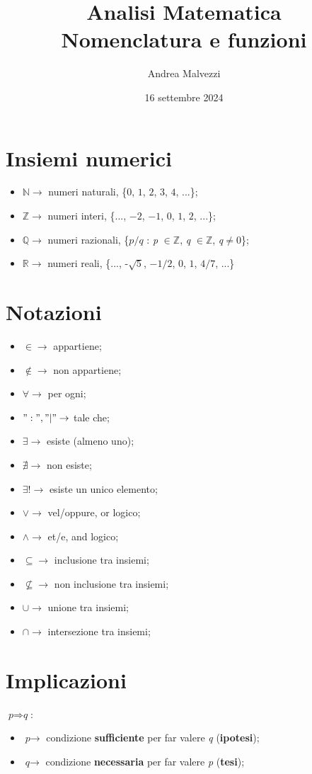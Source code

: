 \documentclass[12pt]{article}
\title{\textbf{Analisi Matematica\\Nomenclatura e funzioni}}
\date{16 settembre 2024}
\author{Andrea Malvezzi}
\begin{document}
\maketitle
\pagebreak
\tableofcontents
\pagebreak
\section{Insiemi numerici}
\begin{itemize}
    \item $\mathbb{N} \rightarrow$ numeri naturali, \{$0$, $1$, $2$, $3$, $4$, ...\};
    \item $\mathbb{Z} \rightarrow$ numeri interi, \{..., $-2$, $-1$, $0$, $1$, $2$, ...\};
    \item $\mathbb{Q} \rightarrow$ numeri razionali, \{$\textit{p}/\textit{q}$ : \textit{p} $\in \mathbb{Z}$, \textit{q} $\in \mathbb{Z}$, \textit{q}$\neq 0$\};
    \item $\mathbb{R} \rightarrow$ numeri reali, \{..., -$\sqrt{5}$, $-1/2$, $0$, $1$, $4/7$, ...\}
\end{itemize}
\section{Notazioni}
\begin{itemize}
    \item $\in \rightarrow$ appartiene;
    \item $\notin \rightarrow$ non appartiene;
    \item $\forall \rightarrow$ per ogni;
    \item $":", "|" \rightarrow$ tale che;
    \item $\exists \rightarrow$ esiste (almeno uno);
    \item $\nexists \rightarrow$ non esiste;
    \item $\exists! \rightarrow$ esiste un unico elemento;
    \item $\lor \rightarrow$ vel/oppure, or logico;
    \item $\land \rightarrow$ et/e, and logico;
    \item $\subseteq \rightarrow$ inclusione tra insiemi;
    \item $\nsubseteq \rightarrow$ non inclusione tra insiemi;
    \item $\cup \rightarrow$ unione tra insiemi;
    \item $\cap \rightarrow$ intersezione tra insiemi;
\end{itemize}
\section{Implicazioni}
$\textit{p} \Rightarrow \textit{q}$:
\begin{itemize}
    \item $\textit{p} \rightarrow$ condizione \textbf{sufficiente} per far valere \textit{q} (\textbf{ipotesi});
    \item $\textit{q} \rightarrow$ condizione \textbf{necessaria} per far valere \textit{p} (\textbf{tesi});
\end{itemize}
\end{document}

